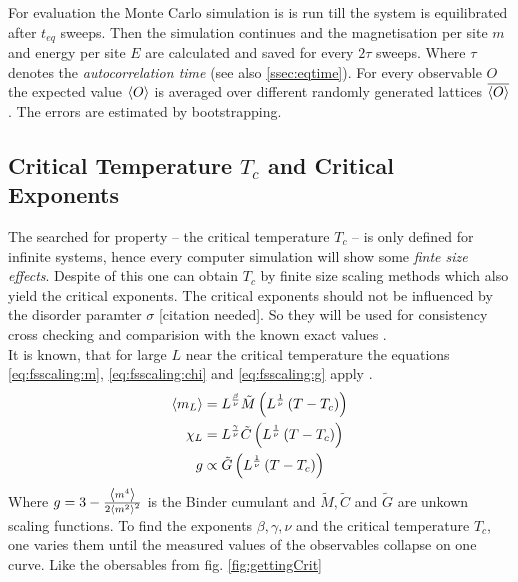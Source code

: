     For evaluation the Monte Carlo simulation is is run till the system
    is equilibrated after \(t_{eq}\) sweeps. Then the simulation continues
    and the magnetisation per site \(m\) and energy per site \(E\)
    are calculated and saved for every \(2\tau\) sweeps. Where \(\tau\)
    denotes the \emph{autocorrelation time} (see also \ref{ssec:eqtime}).
    For every observable \(O\) the expected value \(\left< O \right>\) is averaged
    over different randomly generated lattices \(\overline{\left< O \right>}\). The
    errors are estimated by bootstrapping.

\subsection{Critical Temperature $T_c$ and Critical Exponents}
\label{ssec:finitesize}
    The searched for property -- the critical temperature \(T_c\)
    -- is only defined for infinite systems, hence every computer
    simulation will show some \emph{finte size effects}.
    Despite of this one can obtain \(T_c\) by finite size scaling
    methods \cite[S. ??]{NewmanBarkema1999} which also yield the critical
    exponents. The critical exponents should not be influenced by the
    disorder paramter \(\sigma\) [citation needed]. So they will be
    used for consistency cross checking and comparision with the known
    exact values \cite[S. 59]{Pelissetto2002}.\\
    It is known, that for large \(L\) near the critical temperature the
    equations \eqref{eq:fsscaling:m}, \eqref{eq:fsscaling:chi} and
    \eqref{eq:fsscaling:g} apply \cite[p. 145f]{Katzgraber2011}.
    \begin{align}
        \label{eq:fsscaling:m}
        \left< m_L \right> &= L^\frac{\beta}{\nu} \tilde{M}\left(L^\frac{1}{\nu}\left(T-T_c\right)\right)\\
        \label{eq:fsscaling:chi}
        \chi_L    &= L^\frac{\gamma}{\nu} \tilde{C}\left(L^\frac{1}{\nu}\left(T-T_c\right)\right)\\
        \label{eq:fsscaling:g}
        g         &\propto \tilde{G}\left(L^\frac{1}{\nu}\left(T-T_c\right)\right)
    \end{align}
    Where \(g = 3-\frac{\left< m^4 \right>}{2\left< m^2 \right>^2}\) \cite{Binder1981} is
    the Binder cumulant and \(\tilde{M}, \tilde{C}\) and \(\tilde{G}\)
    are unkown scaling functions. To find the exponents
    \(\beta, \gamma, \nu\) and the critical temperature \(T_c\), one
    varies them until the measured values of the observables collapse on
    one curve. Like the obersables from fig. \ref{fig:gettingCrit}

